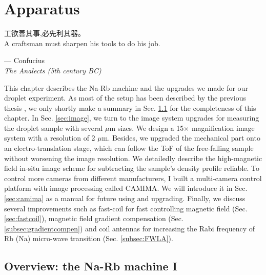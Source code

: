 \chapter{Apparatus}
\label{Chap_Apparatus}

\setlength{\unitlength}{1pt}
\setlength{\epigraphwidth}{10.5cm}
\epigraph{工欲善其事,必先利其器。\\ A craftsman must sharpen his tools to do his job.}{--- Confucius\\ \textit{The Analects (5th century BC)}}

This chapter describes the Na-Rb machine and the upgrades we made for our droplet experiment. As most of the setup has been described by the previous thesis \cite{WangFudong2016Soau,LiXiaoke2015Chsd}, we only shortly make a summary in Sec. \ref{sec:machine} for the completeness of this chapter. In Sec. \ref{sec:image}, we turn to the image system upgrades for measuring the droplet sample with several $\mu$m sizes. We design a 15$\times$ magnification image system with a resolution of 2 $\mu$m. Besides, we upgraded the mechanical part onto an electro-translation stage, which can follow the ToF of the free-falling sample without worsening the image resolution. We detailedly describe the high-magnetic field in-situ image scheme for subtracting the sample's density profile reliable. To control more cameras from different manufacturers, I built a multi-camera control platform with image processing called CAMIMA. We will introduce it in Sec. \ref{sec:camima} as a manual for future using and upgrading. Finally, we discuss several improvements such as fast-coil for fast controlling magnetic field (Sec. \ref{sec:fastcoil}), magnetic field gradient compensation (Sec. \ref{subsec:gradientcompen}) and coil antennas for increasing the Rabi frequency of Rb (Na) micro-wave transition (Sec. \ref{subsec:FWLA}).

\section{Overview: the Na-Rb machine I}
\label{sec:machine}

